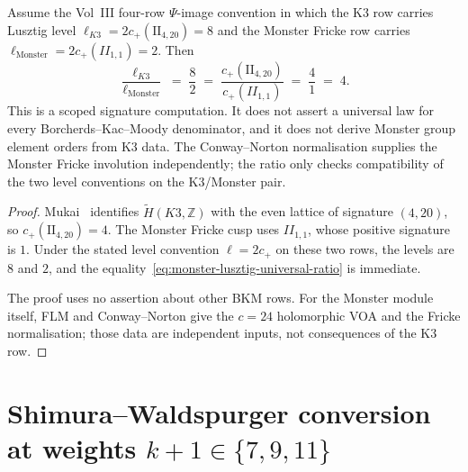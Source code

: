 \begin{theorem}
\label{thm:monster-lusztig-universal-ratio}
%
%
Assume the Vol~III four-row $\Psi$-image convention in which the
K3 row carries Lusztig level
$\ell_{K3}=2c_+(\mathrm{II}_{4,20})=8$ and the Monster Fricke
row carries $\ell_{\mathrm{Monster}}=2c_+(II_{1,1})=2$. Then
\begin{equation}\label{eq:monster-lusztig-universal-ratio}
 \frac{\ell_{K3}}{\ell_{\mathrm{Monster}}}
 \;=\;
 \frac{8}{2}
 \;=\;
 \frac{c_+(\mathrm{II}_{4,20})}{c_+(II_{1,1})}
 \;=\;
 \frac{4}{1}
 \;=\;
 4.
\end{equation}
This is a scoped signature computation. It does not assert a
universal law for every Borcherds--Kac--Moody denominator, and it
does not derive Monster group element orders from K3 data. The
Conway--Norton normalisation supplies the Monster Fricke
involution independently; the ratio only checks compatibility of
the two level conventions on the K3/Monster pair.
\end{theorem}

\begin{proof}
Mukai~\cite{Mukai1987} identifies
$\widetilde H(K3,\mathbb Z)$ with the even lattice of signature
$(4,20)$, so $c_+(\mathrm{II}_{4,20})=4$. The Monster Fricke cusp
uses $II_{1,1}$, whose positive signature is $1$. Under the stated
level convention $\ell=2c_+$ on these two rows, the levels are
$8$ and $2$, and the equality~\eqref{eq:monster-lusztig-universal-ratio}
is immediate.

The proof uses no assertion about other BKM rows. For the Monster
module itself, FLM and Conway--Norton give the $c=24$ holomorphic
VOA and the Fricke normalisation; those data are independent
inputs, not consequences of the K3 row.
\end{proof}

\section{Shimura--Waldspurger conversion at weights $k+1 \in \{7, 9, 11\}$}
\label{sec:shimura-waldspurger-higher-weights}

